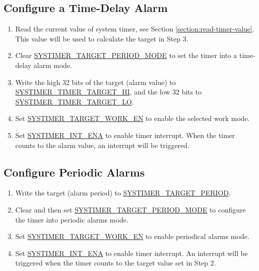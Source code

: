\documentclass[main\_\_EN.tex]{subfiles}
\begin{document}
\subsection{Configure a Time-Delay Alarm}

\begin{enumerate}
    \item Read the current value of system timer, see Section \ref{section:read-timer-value}. This value will be used to calculate the target in Step 3.
    \item Clear \hyperref[fielddesc:SYSTIMERTARGET0PERIODMODE]{ SYSTIMER\_TARGET\_PERIOD\_MODE} to set the timer into a time-delay alarm mode.
    \item Write the high 32 bits of the target (alarm value) to \hyperref[fielddesc:SYSTIMERTIMERTARGET0HI]{SYSTIMER\_TIMER\_TARGET\_HI}, and the low 32 bits to \hyperref[fielddesc:SYSTIMERTIMERTARGET0LO]{SYSTIMER\_TIMER\_TARGET\_LO}.
    \item Set \hyperref[fielddesc:SYSTIMERTARGET0WORKEN]{ SYSTIMER\_TARGET\_WORK\_EN} to enable the selected work mode.
    \item Set \hyperref[fielddesc:SYSTIMERINT0ENA]{SYSTIMER\_INT\_ENA} to enable timer interrupt. When the timer counts to the alarm value, an interrupt will be triggered.
\end{enumerate}

\subsection{Configure Periodic Alarms}

\begin{enumerate}
     \item Write the target (alarm period) to \hyperref[fielddesc:SYSTIMERTARGET0PERIOD]{SYSTIMER\_TARGET\_PERIOD}.
    \item Clear and then set \hyperref[fielddesc:SYSTIMERTARGET0PERIODMODE]{ SYSTIMER\_TARGET\_PERIOD\_MODE} to configure the timer into periodic alarms mode.
    \item Set \hyperref[fielddesc:SYSTIMERTARGET0WORKEN]{ SYSTIMER\_TARGET\_WORK\_EN} to enable periodical alarms mode.
    \item Set \hyperref[fielddesc:SYSTIMERINT0ENA]{SYSTIMER\_INT\_ENA} to enable timer interrupt. An interrupt will be triggered when the timer counts to the target value set in Step 2.
\end{enumerate}
\end{document}

